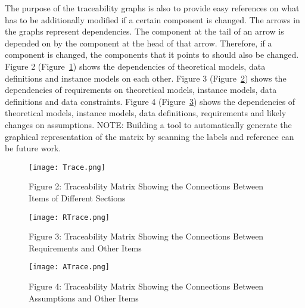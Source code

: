 \documentclass[12pt]{article}
\begin{document}
The purpose of the traceability graphs is also to provide easy references on what has to be additionally modified if a certain component is changed. The arrows in the graphs represent dependencies. The component at the tail of an arrow is depended on by the component at the head of that arrow. Therefore, if a component is changed, the components that it points to should also be changed. Figure 2 (Figure~\ref{Figure:F2TMStCBIoDS}) shows the dependencies of theoretical models, data definitions and instance models on each other. Figure 3 (Figure~\ref{Figure:F3TMStCBRaOI}) shows the dependencies of requirements on theoretical models, instance models, data definitions and data constraints. Figure 4 (Figure~\ref{Figure:F4TMStCBAaOI}) shows the dependencies of theoretical models, instance models, data definitions, requirements and likely changes on assumptions.
NOTE: Building a tool to automatically generate the graphical representation of the matrix by scanning the labels and reference can be future work.
\begin{figure}
\begin{center}
\texttt{[image: Trace.png]}
\caption{Figure 2: Traceability Matrix Showing the Connections Between Items of Different Sections}
\label{Figure:F2TMStCBIoDS}
\end{center}
\end{figure}
\begin{figure}
\begin{center}
\texttt{[image: RTrace.png]}
\caption{Figure 3: Traceability Matrix Showing the Connections Between Requirements and Other Items}
\label{Figure:F3TMStCBRaOI}
\end{center}
\end{figure}
\begin{figure}
\begin{center}
\texttt{[image: ATrace.png]}
\caption{Figure 4: Traceability Matrix Showing the Connections Between Assumptions and Other Items}
\label{Figure:F4TMStCBAaOI}
\end{center}
\end{figure}
\end{document}
